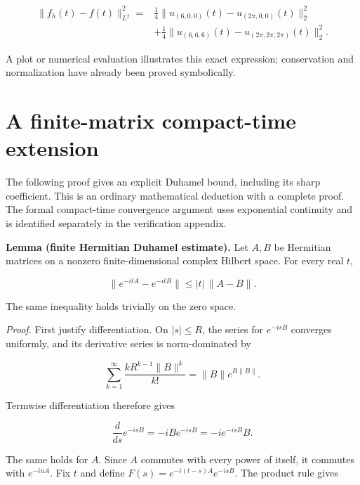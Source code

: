 \[
\begin{aligned}
\|f_h(t)-f(t)\|_{L^2}^2
={}&\frac14\|u_{(6,0,0)}(t)-u_{(2\pi,0,0)}(t)\|_2^2\\
&+\frac14\|u_{(6,6,6)}(t)-u_{(2\pi,2\pi,2\pi)}(t)\|_2^2.
\end{aligned}
\]

A plot or numerical evaluation illustrates this exact expression;
conservation and normalization have already been proved symbolically.


\hypertarget{a-finite-matrix-compact-time-extension}{%
\section{A finite-matrix compact-time
extension}\label{a-finite-matrix-compact-time-extension}}

The following proof gives an explicit Duhamel bound, including its sharp coefficient. This is an ordinary mathematical deduction with a complete proof. The formal compact-time convergence argument uses exponential continuity and is identified separately in the verification appendix.

\textbf{Lemma (finite Hermitian Duhamel estimate).} Let \(A,B\) be
Hermitian matrices on a nonzero finite-dimensional complex Hilbert
space. For every real \(t\),

\[
\|e^{-itA}-e^{-itB}\|\le |t|\,\|A-B\|.
\]

The same inequality holds trivially on the zero space.

\emph{Proof.} First justify differentiation. On \(|s|\le R\), the
series for \(e^{-isB}\) converges uniformly, and its derivative series
is norm-dominated by

\[
\sum_{k=1}^{\infty}\frac{kR^{k-1}\|B\|^k}{k!}
=\|B\|e^{R\|B\|}.
\]

Termwise differentiation therefore gives

\[
\frac{d}{ds}e^{-isB}=-iB e^{-isB}=-ie^{-isB}B.
\]

The same holds for \(A\). Since \(A\) commutes with every power of
itself, it commutes with \(e^{-iuA}\). Fix \(t\) and define
\(F(s)=e^{-i(t-s)A}e^{-isB}\). The product rule gives

